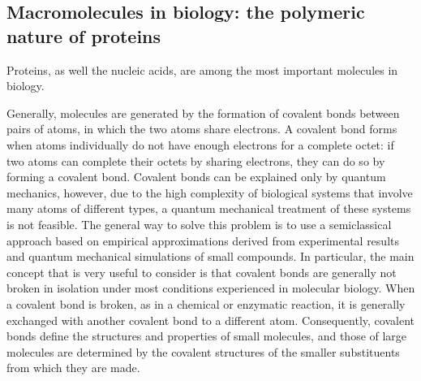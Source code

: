 \subsection{Macromolecules in biology: the polymeric nature of proteins}\label{ssec:polym-prot}
Proteins, as well the nucleic acids, are among the most important molecules in biology. 

Generally, molecules are generated by the formation of covalent bonds between pairs of atoms, in which the two atoms share electrons. A covalent bond forms when atoms individually do not have enough electrons for a complete octet: if two atoms can complete their octets by sharing electrons, they can do so by forming a covalent bond. Covalent bonds can be explained only by quantum mechanics, however, due to the high complexity of biological systems that involve many atoms of different types, a quantum mechanical treatment of these systems is not feasible.
The general way to solve this problem is to use a semiclassical approach based on empirical approximations derived from experimental results and quantum mechanical simulations of small compounds. In particular, the main concept that is very useful to consider is that covalent bonds are generally not broken in isolation under most conditions experienced in molecular biology. When a covalent bond is broken, as in a chemical or enzymatic reaction, it is generally exchanged with another covalent bond to a different atom. Consequently, covalent bonds define the structures and properties of small molecules, and those of large molecules are determined by the covalent structures of the smaller substituents from which they are made.

